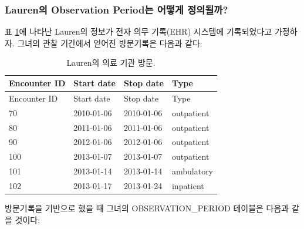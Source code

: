 \documentclass[11pt]{book}
\theoremstyle{definition}
\theoremstyle{definition}
\theoremstyle{definition}
\theoremstyle{remark}
\begin{document}
\subsubsection*{Lauren의 Observation Period는 어떻게
정의될까?}\label{lauren-observation-period--}

표 \ref{tab:encounters}에 나타난 Lauren의 정보가 전자 의무 기록(EHR)
시스템에 기록되었다고 가정하자. 그녀의 관찰 기간에서 얻어진 방문기록은
다음과 같다:

\begin{longtable}[]{@{}llll@{}}
\caption{\label{tab:encounters} Lauren의 의료 기관 방문.}\tabularnewline
\toprule
Encounter ID & Start date & Stop date & Type\tabularnewline
\midrule
\endfirsthead
\toprule
Encounter ID & Start date & Stop date & Type\tabularnewline
\midrule
\endhead
70 & 2010-01-06 & 2010-01-06 & outpatient\tabularnewline
80 & 2011-01-06 & 2011-01-06 & outpatient\tabularnewline
90 & 2012-01-06 & 2012-01-06 & outpatient\tabularnewline
100 & 2013-01-07 & 2013-01-07 & outpatient\tabularnewline
101 & 2013-01-14 & 2013-01-14 & ambulatory\tabularnewline
102 & 2013-01-17 & 2013-01-24 & inpatient\tabularnewline
\bottomrule
\end{longtable}

방문기록을 기반으로 했을 때 그녀의 OBSERVATION\_PERIOD 테이블은 다음과
같을 것이다:
\end{document}
